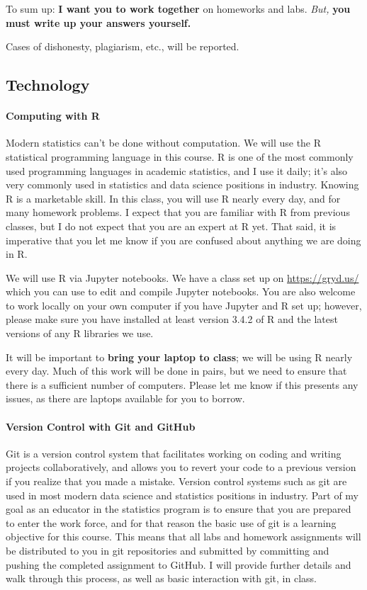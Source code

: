\documentclass[11pt]{article}
\begin{document}
To sum up: \textbf{I want you to work together} on homeworks and labs.  \emph{But,} \textbf{you must write up your answers yourself.}

Cases of dishonesty, plagiarism, etc., will be reported.

\subsection*{Technology}

\paragraph{Computing with R}

Modern statistics can't be done without computation.  We will use the R statistical programming language in this course.  R is one of the most commonly used programming languages in academic statistics, and I use it daily; it's also very commonly used in statistics and data science positions in industry.  Knowing R is a marketable skill.  In this class, you will use R nearly every day, and for many homework problems.  I expect that you are familiar with R from previous classes, but I do not expect that you are an expert at R yet.  That said, it is imperative that you let me know if you are confused about anything we are doing in R.

We will use R via Jupyter notebooks.  We have a class set up on \url{https://gryd.us/} which you can use to edit and compile Jupyter notebooks.  You are also welcome to work locally on your own computer if you have Jupyter and R set up; however, please make sure you have installed at least version 3.4.2 of R and the latest versions of any R libraries we use.

It will be important to \textbf{bring your laptop to class}; we will be using R nearly every day.  Much of this work will be done in pairs, but we need to ensure that there is a sufficient number of computers.  Please let me know if this presents any issues, as there are laptops available for you to borrow.

\paragraph{Version Control with Git and GitHub}

Git is a version control system that facilitates working on coding and writing projects collaboratively, and allows you to revert your code to a previous version if you realize that you made a mistake.  Version control systems such as git are used in most modern data science and statistics positions in industry.  Part of my goal as an educator in the statistics program is to ensure that you are prepared to enter the work force, and for that reason the basic use of git is a learning objective for this course.  This means that all labs and homework assignments will be distributed to you in git repositories and submitted by committing and pushing the completed assignment to GitHub.  I will provide further details and walk through this process, as well as basic interaction with git, in class.
\end{document}
